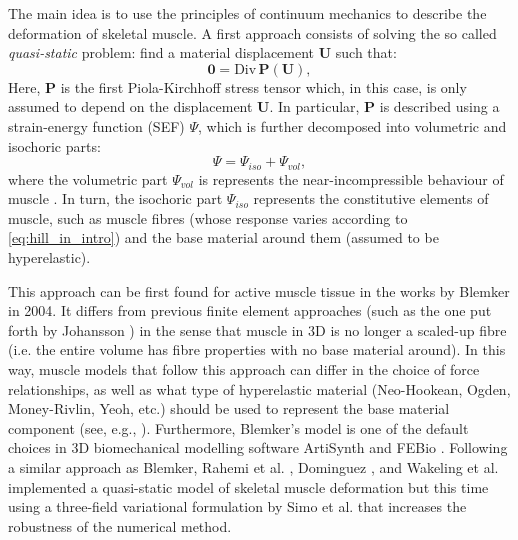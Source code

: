 \documentclass{sfuthesis}
\numberwithin{equation}{section}
\numberwithin{figure}{chapter}
\numberwithin{table}{chapter}
\theoremstyle{definition}
\def\*#1{{\mathbf{#1}}} %
\newcommand{\Divt}[1]{{\bm{\mathrm{Div}} \, #1}}
\begin{document}
The main idea is to use the principles of continuum mechanics to describe the deformation of skeletal muscle. A first approach consists of solving the so called \textit{quasi-static} problem: find a material displacement $\*U$ such that:
\begin{equation} \label{eq:intro_quasistatic_problem}
    \*0 = \Divt{\*P(\*U)},
\end{equation}
Here, $\*P$ is the first Piola-Kirchhoff stress tensor which, in this case, is only assumed to depend on the displacement $\*U$. In particular, $\*P$ is described using a strain-energy function (SEF) $\Psi$, which is further decomposed into volumetric and isochoric parts:
\begin{equation}
    \Psi = \Psi_{iso} + \Psi_{vol},
\end{equation}
where the volumetric part $\Psi_{vol}$ is represents the near-incompressible behaviour of muscle \cite{BaskinPaolini}. In turn, the isochoric part $\Psi_{iso}$ represents the constitutive elements of muscle, such as muscle fibres (whose response varies according to \eqref{eq:hill_in_intro}) and the base material around them (assumed to be hyperelastic). 

This approach can be first found for active muscle tissue in the works by Blemker \cite{BlemkerThesis,BlemkerDelp2005,BlemkerPinskyDelp2005} in 2004. It differs from previous finite element approaches (such as the one put forth by Johansson \cite{Johansson2000}) in the sense that muscle in 3D is no longer a scaled-up fibre (i.e. the entire volume has fibre properties with no base material around). In this way, muscle models that follow this approach can differ in the choice of force relationships, as well as what type of hyperelastic material (Neo-Hookean, Ogden, Money-Rivlin, Yeoh, etc.) should be used to represent the base material component (see, e.g., \cite{HeidlaufRohrle2013,Tang2007}). Furthermore, Blemker's model is one of the default choices in 3D biomechanical modelling software ArtiSynth \cite{Artisynth} and FEBio \cite{FEBio}. Following a similar approach as Blemker, Rahemi et al. \cite{RahemiNigamWakeling2014,RahemiNigamWakeling2015}, Dominguez \cite{Seba}, and Wakeling et al. \cite{Paper1_WakelingEtAl2020} implemented a quasi-static model of skeletal muscle deformation but this time using a three-field variational formulation by Simo et al. \cite{SimoTaylorPister1985} that increases the robustness of the numerical method.
\end{document}
